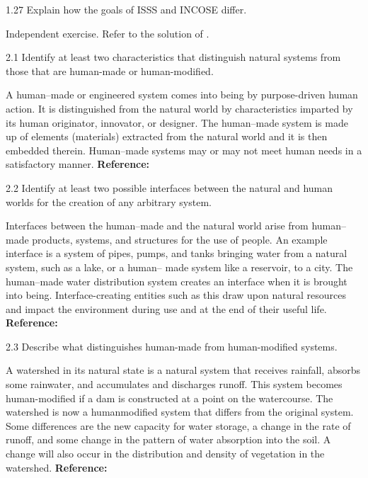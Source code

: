 \begin{exsol@exercise}{1.27}
    \label{sea-1-37}
        Explain how the goals of ISSS and INCOSE differ.
\end{exsol@exercise}
\begin{exsol@solution}{}
        Independent exercise. Refer to the solution of .
\end{exsol@solution}
\begin{exsol@exercise}{2.1}
    \label{sea-2-1}
        Identify at least two characteristics that distinguish natural systems from those that are human-made or human-modified.
\end{exsol@exercise}
\begin{exsol@solution}{}
        A human–made or engineered system comes into being by purpose-driven human action. It is distinguished from the natural world by characteristics imparted by its human originator, innovator, or designer. The human–made system is made up of elements (materials) extracted from the natural world and it is then embedded therein. Human–made systems may or may not meet human needs in a satisfactory manner. \textbf{Reference:}
\end{exsol@solution}
\begin{exsol@exercise}{2.2}
    \label{sea-2-2}
        Identify at least two possible interfaces between the natural and human worlds for the creation of any arbitrary system.
\end{exsol@exercise}
\begin{exsol@solution}{}
        Interfaces between the human–made and the natural world arise from human–made products, systems, and structures for the use of people. An example interface is a system of pipes, pumps, and tanks bringing water from a natural system, such as a lake, or a human– made system like a reservoir, to a city. The human–made water distribution system creates an interface when it is brought into being. Interface-creating entities such as this draw upon natural resources and impact the environment during use and at the end of their useful life. \textbf{Reference:}
\end{exsol@solution}
\begin{exsol@exercise}{2.3}
    \label{sea-2-3}
        Describe what distinguishes human-made from human-modified systems.
\end{exsol@exercise}
\begin{exsol@solution}{}
        A watershed in its natural state is a natural system that receives rainfall, absorbs some rainwater, and accumulates and discharges runoff. This system becomes human-modified if a dam is constructed at a point on the watercourse. The watershed is now a humanmodified system that differs from the original system. Some differences are the new capacity for water storage, a change in the rate of runoff, and some change in the pattern of water absorption into the soil. A change will also occur in the distribution and density of vegetation in the watershed. \textbf{Reference:}
\end{exsol@solution}
